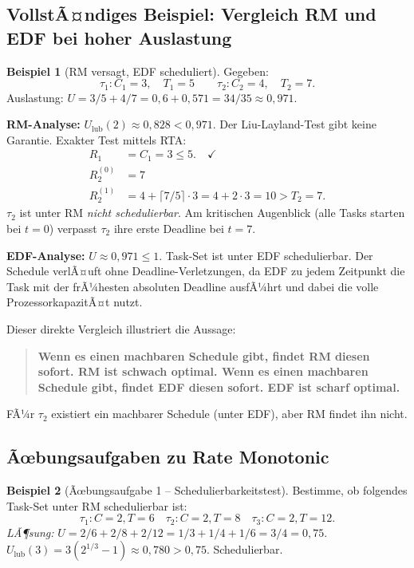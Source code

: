 ﻿\documentclass[a4paper,12pt]{report}
\theoremstyle{definition}
\newtheorem{beispiel}{Beispiel}[chapter]
\begin{document}
\subsection{VollstÃ¤ndiges Beispiel: Vergleich RM und EDF bei hoher Auslastung}

\begin{beispiel}[RM versagt, EDF scheduliert]
	\label{bsp:rm_edf_vergleich}
	Gegeben:
	\[
		\tau_1: C_1 = 3, \quad T_1 = 5 \qquad \tau_2: C_2 = 4, \quad T_2 = 7.
	\]
	Auslastung: $U = 3/5 + 4/7 = 0{,}6 + 0{,}571 = 34/35 \approx 0{,}971$.

	\textbf{RM-Analyse:}
	$U_{\text{lub}}(2) \approx 0{,}828 < 0{,}971$. Der Liu-Layland-Test gibt keine
	Garantie. Exakter Test mittels RTA:
	\begin{align*}
		R_1 &= C_1 = 3 \leq 5. \quad\checkmark \\
		R_2^{(0)} &= 7 \\
		R_2^{(1)} &= 4 + \lceil 7/5 \rceil \cdot 3 = 4 + 2 \cdot 3 = 10 > T_2 = 7.
	\end{align*}
	$\tau_2$ ist unter RM \emph{nicht schedulierbar}. Am kritischen Augenblick
	(alle Tasks starten bei $t=0$) verpasst $\tau_2$ ihre erste Deadline bei $t=7$.

	\textbf{EDF-Analyse:}
	$U \approx 0{,}971 \leq 1$. Task-Set ist unter EDF schedulierbar. Der Schedule
	verlÃ¤uft ohne Deadline-Verletzungen, da EDF zu jedem Zeitpunkt die Task mit der
	frÃ¼hesten absoluten Deadline ausfÃ¼hrt und dabei die volle ProzessorkapazitÃ¤t nutzt.

	Dieser direkte Vergleich illustriert die Aussage:
	\begin{quote}
		\textbf{Wenn es einen machbaren Schedule gibt, findet RM diesen sofort. RM ist schwach optimal.
		Wenn es einen machbaren Schedule gibt, findet EDF diesen sofort. EDF ist scharf optimal.}
	\end{quote}
	FÃ¼r $\tau_2$ existiert ein machbarer Schedule (unter EDF), aber RM findet ihn nicht.
\end{beispiel}

\subsection{Ãœbungsaufgaben zu Rate Monotonic}

\begin{beispiel}[Ãœbungsaufgabe 1 -- Schedulierbarkeitstest]
	Bestimme, ob folgendes Task-Set unter RM schedulierbar ist:
	\[
		\tau_1: C=2, T=6 \quad \tau_2: C=2, T=8 \quad \tau_3: C=2, T=12.
	\]
	\textit{LÃ¶sung:} $U = 2/6 + 2/8 + 2/12 = 1/3 + 1/4 + 1/6 = 3/4 = 0{,}75$.
	$U_{\text{lub}}(3) = 3(2^{1/3}-1) \approx 0{,}780 > 0{,}75$. Schedulierbar. \checkmark
\end{beispiel}
\end{document}
